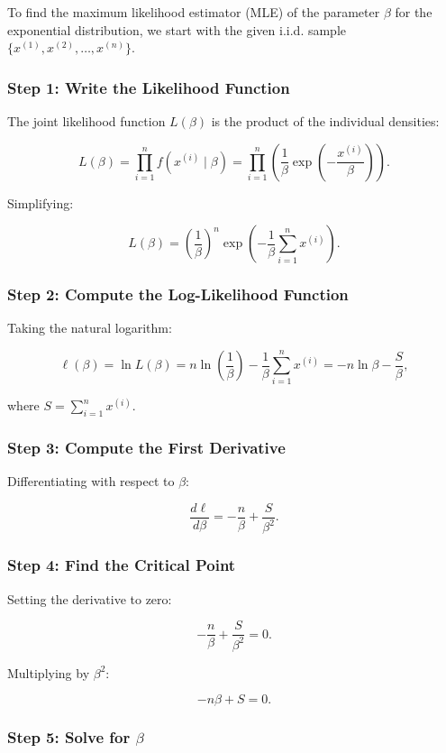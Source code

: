 \documentclass{article}
\begin{document}
To find the maximum likelihood estimator (MLE) of the parameter $\beta$ for the exponential distribution, we start with the given i.i.d. sample $\{x^{(1)}, x^{(2)}, \ldots, x^{(n)}\}$.

\subsubsection*{Step 1: Write the Likelihood Function}

The joint likelihood function $L(\beta)$ is the product of the individual densities:

\[
L(\beta) = \prod_{i=1}^{n} f\left(x^{(i)} \mid \beta\right) = \prod_{i=1}^{n} \left( \frac{1}{\beta} \exp\left( -\frac{x^{(i)}}{\beta} \right) \right).
\]

Simplifying:

\[
L(\beta) = \left( \frac{1}{\beta} \right)^n \exp\left( -\frac{1}{\beta} \sum_{i=1}^{n} x^{(i)} \right).
\]

\subsubsection*{Step 2: Compute the Log-Likelihood Function}

Taking the natural logarithm:

\[
\ell(\beta) = \ln L(\beta) = n \ln\left( \frac{1}{\beta} \right) - \frac{1}{\beta} \sum_{i=1}^{n} x^{(i)} = -n \ln \beta - \frac{S}{\beta},
\]

where $S = \sum_{i=1}^{n} x^{(i)}$.

\subsubsection*{Step 3: Compute the First Derivative}

Differentiating with respect to $\beta$:

\[
\frac{d\ell}{d\beta} = -\frac{n}{\beta} + \frac{S}{\beta^2}.
\]

\subsubsection*{Step 4: Find the Critical Point}

Setting the derivative to zero:

\[
-\frac{n}{\beta} + \frac{S}{\beta^2} = 0.
\]

Multiplying by $\beta^2$:

\[
-n\beta + S = 0.
\]

\subsubsection*{Step 5: Solve for $\beta$}
\end{document}
